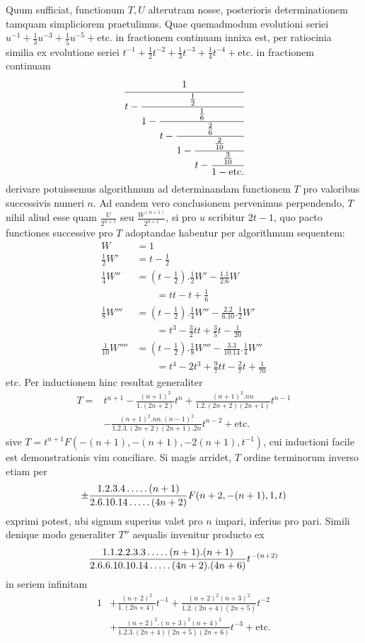 Quum sufficiat, functionum $T,U$ alterutram nosse, posterioris determinationem tamquam simpliciorem praetulimus. Quae quemadmodum evolutioni
seriei $u^{-1}+\frac13u^{-3}+\frac15u^{-5}+\text{etc.}$ in fractionem continuam innixa est, per ratiocinia similia ex evolutione seriei $t^{-1}+\frac12t^{-2}+\frac13t^{-3}+\frac14t^{-4}+\text{etc.}$ in fractionem
continuam
\[
\cfrac1{t-\cfrac{\frac12}{1-\cfrac{\frac16}
{t-\cfrac{\frac26}{1-\cfrac{\frac2{10}}
{t-\cfrac{\frac3{10}}{1-\mathrm{etc.}}}}}}}
\]
derivare potuissemus algorithmum ad determinandam
functionem $T$ pro valoribus successivis numeri $n$. Ad eandem
vero conclusionem pervenimus perpendendo, $T$ nihil aliud esse
quam $\frac U{2^{n+1}}$ seu $\frac{W^{(n+1)}}{2^{n+1}}$,
si pro $u$ scribitur $2t-1$, quo pacto functiones successive pro
$T$ adoptandae habentur per algorithmum sequentem:
\[
\begin{aligned}
W&=1\\
\tfrac12W'&=t-\tfrac12\\
\tfrac14W''&=(t-\tfrac12).\tfrac12W'-\frac{1.1}{2.6}W
\\[3pt]&\qquad=tt-t+\tfrac16\\
\tfrac18W'''&=(t-\tfrac12).\tfrac14W''-\frac{2.2}{6.10}.\tfrac12W'
\\[3pt]&\qquad=t^3-\tfrac32tt+\tfrac35t-\tfrac1{20}\\
\tfrac1{10}W''''&=(t-\tfrac12).\tfrac18W'''-\frac{3.3}{10.14}.\tfrac14W''
\\[3pt]&\qquad=t^4-2t^3+\tfrac97tt-\tfrac27t+\tfrac1{70}
\end{aligned}
\]
etc. Per inductionem hinc resultat generaliter
\[
\begin{aligned}
T={}&t^{n+1}-\frac{(n+1)^2}{1.(2n+2)}t^n
+\frac{(n+1)^2.nn}{1.2.(2n+2)(2n+1)}t^{n-1}\\
&-\frac{(n+1)^2.nn.(n-1)^2}{1.2.3.(2n+2)(2n+1).2n}t^{n-2}
+\mathrm{etc.}
\end{aligned}
\]
sive $T=t^{n+1}F(-(n+1),-(n+1),-2(n+1),t^{-1})$,
cui inductioni facile est demonstrationis vim conciliare.
Si magis arridet, $T$ ordine terminorum inverso etiam per
\[
\pm\frac{1.2.3.4\mathinner{.\,.\,.\,.\,.}(n+1)}
{2.6.10.14\mathinner{.\,.\,.\,.\,.}(4n+2)}
F(n+2,-(n+1),1,t)
\]
exprimi potest, ubi signum superius valet pro $n$ impari,
inferius pro pari. Simili denique modo generaliter $T''$
aequalis invenitur producto ex
\[
\frac{1.1.2.2.3.3\mathinner{.\,.\,.\,.\,.}(n+1).(n+1)}
{2.6.6.10.10.14\mathinner{.\,.\,.\,.\,.}(4n+2).(4n+6)}t^{-(n+2)}
\]
in seriem infinitam
\[
\begin{aligned}
1&+\frac{(n+2)^2}{1.(2n+4)}t^{-1}
+\frac{(n+2)^2(n+3)^2}{1.2.(2n+4)(2n+5)}t^{-2}\\
&+\frac{(n+2)^2.(n+3)^2(n+4)^2}
{1.2.3.(2n+4)(2n+5)(2n+6)}t^{-3}+\mathrm{etc.}
\end{aligned}
\]
